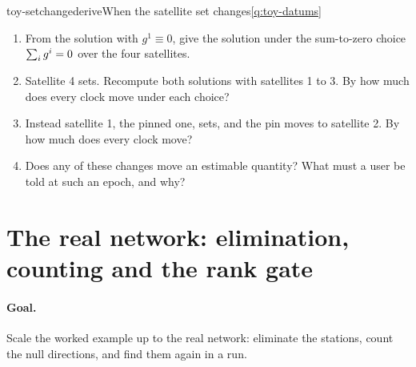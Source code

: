 \begin{question}{toy-setchange}{derive}{When the satellite set changes}{\ref{q:toy-datums}}
\begin{enumerate}[leftmargin=*, itemsep=1pt]
\item From the solution with $g^1 \equiv 0$, give the solution under the
      sum-to-zero choice $\sum_i g^i = 0$ over the four satellites.
\item Satellite 4 sets. Recompute both solutions with satellites 1 to 3. By how
      much does every clock move under each choice?
\item Instead satellite 1, the pinned one, sets, and the pin moves to satellite
      2. By how much does every clock move?
\item Does any of these changes move an estimable quantity? What must a user be
      told at such an epoch, and why?
\end{enumerate}
\end{question}


\section{The real network: elimination, counting and the rank gate}\label{sec:l3}

\paragraph{Goal.} Scale the worked example up to the real network: eliminate the
stations, count the null directions, and find them again in a run.

